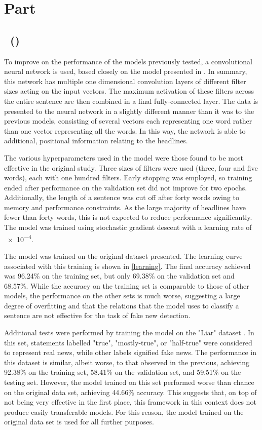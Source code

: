 \documentclass{article}
\newcommand{\enterproblemHeader}[1]{
}
\newcommand{\exitproblemHeader}[1]{
}
\newcounter{problem} %
\newcommand{\problemName}{}
\newenvironment{problem}[1][Part \theproblem]{ %
	\stepcounter{problem} %
	\renewcommand{\problemName}{#1} %
	\section{\problemName} %
	\enterproblemHeader{\problemName} %
}{
	\exitproblemHeader{\problemName} %
}
\newcounter{subproblem}[problem]
\newcommand{\subproblemName}{}
\newenvironment{subproblem}[1][\theproblem~(\alph{subproblem})]{ %
	\stepcounter{subproblem}
	\renewcommand{\subproblemName}{#1} %
	\subsection{\subproblemName} %
	\enterproblemHeader{\subproblemName} %
}{
	\enterproblemHeader{\problemName} %
}
\begin{document}
\begin{problem}
	
	\begin{subproblem}
		To improve on the performance of the models previously tested, a convolutional neural network is used, based closely on the model presented in \cite{DBLP:journals/corr/Kim14f}. In summary, this network has multiple one dimensional convolution layers of different filter sizes acting on the input vectors. The maximum activation of these filters across the entire sentence are then combined in a final fully-connected layer. The data is presented to the neural network in a slightly different manner than it was to the previous models, consisting of several vectors each representing one word rather than one vector representing all the words. In this way, the network is able to additional, positional information relating to the headlines. 
		
		The various hyperparameters used in the model were those found to be most effective in the original study. Three sizes of filters were used (three, four and five words), each with one hundred filters. Early stopping was employed, so training ended after performance on the validation set did not improve for two epochs. Additionally, the length of a sentence was cut off after forty words owing to memory and performance constraints. As the large majority of headlines have fewer than forty words, this is not expected to reduce performance significantly. The model was trained using stochastic gradient descent with a learning rate of \num{e-4}.
		
		The model was trained on the original dataset presented. The learning curve associated with this training is shown in \cref{learning}. The final accuracy achieved was 96.24\% on the training set, but only 69.38\% on the validation set and 68.57\%.  While the accuracy on the training set is comparable to those of other models, the performance on the other sets is much worse, suggesting a large degree of overfitting and that the relations that the model uses to classify a sentence are not effective for the task of fake new detection.
		
		Additional tests were performed by training the model on the "Liar" dataset \cite{DBLP:journals/corr/Wang17j}. In this set, statements labelled "true", "mostly-true", or "half-true" were considered to represent real news, while other labels signified fake news. The performance in this dataset is similar, albeit worse, to that observed in the previous, achieving 92.38\% on the training set, 58.41\% on the validation set, and 59.51\% on the testing set. However, the model trained on this set performed worse than chance on the original data set, achieving 44.66\% accuracy. This suggests that, on top of not being very effective in the first place, this framework in this context does not produce easily transferable models. For this reason, the model trained on the original data set is used for all further purposes.
		

\end{subproblem}
\end{problem}
\end{document}
